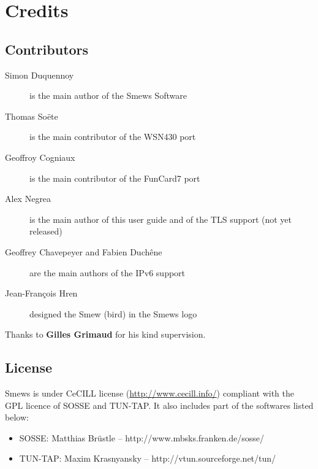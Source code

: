 \documentclass{report}
\begin{document}
\chapter{Credits}

\section{Contributors}

\begin{description}
 \item[Simon Duquennoy] is the main author of the Smews Software
 \item[Thomas So\"{e}te] is the main contributor of the WSN430 port
 \item[Geoffroy Cogniaux] is the main contributor of the FunCard7 port
 \item[Alex Negrea] is the main author of this user guide and of the TLS support (not yet released)
 \item[Geoffrey Chavepeyer \textnormal{and} Fabien Duchêne] are the main authors of the IPv6 support
 \item[Jean-Fran\c{c}ois Hren] designed the Smew (bird) in the Smews logo
\end{description}
Thanks to \textbf{Gilles Grimaud} for his kind supervision.

\section{License}

Smews is under CeCILL license (\url{http://www.cecill.info/}) compliant with the GPL licence of SOSSE and TUN-TAP. It also includes part of the softwares listed below:
\begin{itemize}
 \item SOSSE: Matthias Br\"{u}stle -- http://www.mbsks.franken.de/sosse/
 \item TUN-TAP: Maxim Krasnyansky -- http://vtun.sourceforge.net/tun/
\end{itemize}
\end{document}

